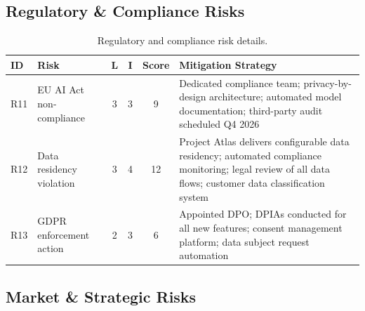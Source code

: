 \documentclass[
    language=english,
    doctype=risk-assessment,
    institution=none,
]{../../omnilatex}
\begin{document}
\subsection{Regulatory \& Compliance Risks}

\begin{table}[h]
    \centering
    \small
    \begin{tabular}{llcccl}
        \toprule
        \textbf{ID} & \textbf{Risk} & \textbf{L} & \textbf{I} & \textbf{Score} & \textbf{Mitigation Strategy} \\
        \midrule
        R11 & EU AI Act non-compliance & 3 & 3 & 9 &
            Dedicated compliance team; privacy-by-design architecture;
            automated model documentation; third-party audit scheduled
            Q4 2026 \\
        R12 & Data residency violation & 3 & 4 & 12 &
            Project Atlas delivers configurable data residency; automated
            compliance monitoring; legal review of all data flows; customer
            data classification system \\
        R13 & GDPR enforcement action & 2 & 3 & 6 &
            Appointed DPO; DPIAs conducted for all new features; consent
            management platform; data subject request automation \\
        \bottomrule
    \end{tabular}
    \caption{Regulatory and compliance risk details.}
\end{table}

\subsection{Market \& Strategic Risks}
\end{document}
